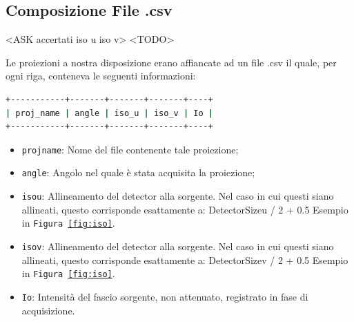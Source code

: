 \documentclass[a4paper,12pt, doubleside]{report}
\begin{document}
                    
            
            \subsection{Composizione File .csv}
                \label{sub:csv}
                <ASK accertati iso u iso v> <TODO>
                \par
                    Le proiezioni a nostra disposizione erano affiancate ad un file .csv il quale, per ogni riga, conteneva le seguenti informazioni:
                    \begin{lstlisting}[language=bash, frame=bt]
+-----------+-------+-------+-------+----+
| proj_name | angle | iso_u | iso_v | Io |
+-----------+-------+-------+-------+----+
                    \end{lstlisting}
                    
                    \begin{itemize}
                        \item \texttt{proj\textunderscore name}: Nome del file contenente tale proiezione;
                        \item \texttt{angle}: Angolo nel quale è stata acquisita la proiezione;
                        \item \texttt{iso\textunderscore u}:  Allineamento del detector alla sorgente. Nel caso in cui questi siano allineati, questo corrisponde esattamente a:
                        \newline
                        Detector\textunderscore Size\textunderscore u / 2 + 0.5
                        \newline
                        Esempio in \texttt{Figura \ref{fig:iso}}.
                        \item \texttt{iso\textunderscore v}: Allineamento del detector alla sorgente. Nel caso in cui questi siano allineati, questo corrisponde esattamente a:
                        \newline
                        Detector\textunderscore Size\textunderscore v / 2 + 0.5
                        \newline
                        Esempio in \texttt{Figura \ref{fig:iso}}.
                        \item \texttt{Io}: Intensità del fascio sorgente, non attenuato, registrato in fase di acquisizione. 
                    \end{itemize}
                    
\end{document}
